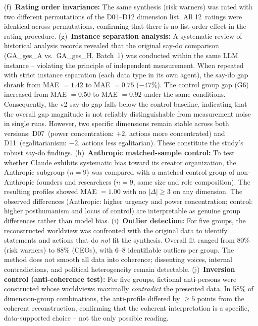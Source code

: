 \documentclass[12pt,a4paper]{article}
\begin{document}
(f)~\textbf{Rating order invariance:} The same synthesis (risk warners) was rated with two different permutations of the D01--D12 dimension list. All 12~ratings were identical across permutations, confirming that there is no list-order effect in the rating procedure.
(g)~\textbf{Instance separation analysis:} A systematic review of historical analysis records revealed that the original say-do comparison (GA\_ges\_A vs.\ GA\_ges\_H, Batch~1) was conducted within the same LLM instance -- violating the principle of independent measurement. When repeated with strict instance separation (each data type in its own agent), the say-do gap shrank from MAE $= 1.42$ to MAE $= 0.75$ ($-47\%$). The control group gap (G6) increased from MAE $= 0.50$ to MAE $= 0.92$ under the same conditions. Consequently, the v2 say-do gap falls below the control baseline, indicating that the overall gap magnitude is not reliably distinguishable from measurement noise in single runs. However, two specific dimensions remain stable across both versions: D07~(power concentration: $+2$, actions more concentrated) and D11~(egalitarianism: $-2$, actions less egalitarian). These constitute the study's robust say-do findings.
(h)~\textbf{Anthropic matched-sample control:} To test whether Claude exhibits systematic bias toward its creator organization, the Anthropic subgroup ($n = 9$) was compared with a matched control group of non-Anthropic founders and researchers ($n = 9$, same size and role composition). The resulting profiles showed MAE $= 1.00$ with no $|\Delta| \geq 3$ on any dimension. The observed differences (Anthropic: higher urgency and power concentration; control: higher posthumanism and locus of control) are interpretable as genuine group differences rather than model bias.
(i)~\textbf{Outlier detection:} For five groups, the reconstructed worldview was confronted with the original data to identify statements and actions that do \emph{not} fit the synthesis. Overall fit ranged from 80\% (risk warners) to 88\% (CEOs), with 6--8 identifiable outliers per group. The method does not smooth all data into coherence; dissenting voices, internal contradictions, and political heterogeneity remain detectable.
(j)~\textbf{Inversion control (anti-coherence test):} For five groups, fictional anti-persons were constructed whose worldviews maximally \emph{contradict} the presented data. In 58\% of dimension-group combinations, the anti-profile differed by $\geq 5$ points from the coherent reconstruction, confirming that the coherent interpretation is a specific, data-supported choice -- not the only possible reading.
\end{document}
